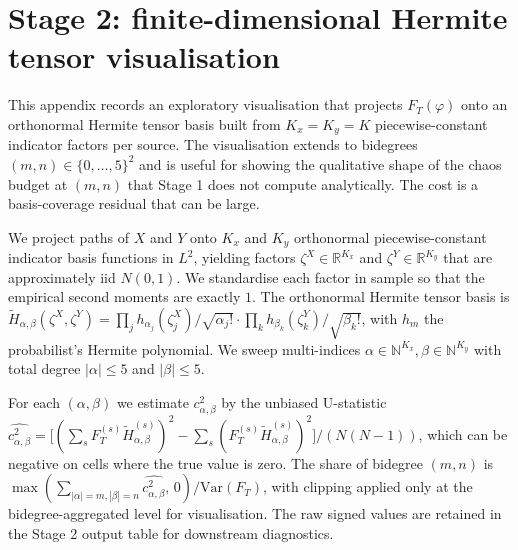 \documentclass[11pt,reqno]{amsart}
\theoremstyle{plain}
\theoremstyle{definition}
\theoremstyle{remark}
\newcommand{\R}{\mathbb{R}}
\newcommand{\N}{\mathbb{N}}
\newcommand{\Var}{\mathrm{Var}}
\begin{document}
\appendix

\section{Stage 2: finite-dimensional Hermite tensor visualisation}
\label{sec:stage2}

This appendix records an exploratory visualisation that projects
$F_T(\varphi)$ onto an orthonormal Hermite tensor basis built from
$K_x = K_y = K$ piecewise-constant indicator factors per source. The
visualisation extends to bidegrees $(m, n) \in \{0, \dots, 5\}^2$ and
is useful for showing the qualitative shape of the chaos budget at
$(m, n)$ that Stage 1 does not compute analytically. The cost is a
basis-coverage residual that can be large.

We project paths of $X$ and $Y$ onto $K_x$ and $K_y$ orthonormal
piecewise-constant indicator basis functions in $L^2$, yielding
factors $\zeta^X \in \R^{K_x}$ and $\zeta^Y \in \R^{K_y}$ that are
approximately iid $N(0, 1)$. We standardise each factor in sample so
that the empirical second moments are exactly $1$. The orthonormal
Hermite tensor basis is
$\widetilde H_{\alpha, \beta}(\zeta^X, \zeta^Y)
 = \prod_j h_{\alpha_j}(\zeta^X_j)/\sqrt{\alpha_j!}
 \cdot \prod_k h_{\beta_k}(\zeta^Y_k)/\sqrt{\beta_k!}$,
with $h_m$ the probabilist's Hermite polynomial. We sweep multi-indices
$\alpha \in \N^{K_x}, \beta \in \N^{K_y}$ with total degree
$|\alpha| \le 5$ and $|\beta| \le 5$.

For each $(\alpha, \beta)$ we estimate $c_{\alpha, \beta}^2$ by the
unbiased U-statistic
$\widehat{c_{\alpha, \beta}^2} =
\bigl[(\sum_s F_T^{(s)} \widetilde H_{\alpha, \beta}^{(s)})^2
 - \sum_s (F_T^{(s)} \widetilde H_{\alpha, \beta}^{(s)})^2\bigr]
/ (N (N - 1))$,
which can be negative on cells where the true value is zero. The
share of bidegree $(m, n)$ is
$\max(\sum_{|\alpha| = m, |\beta| = n} \widehat{c_{\alpha, \beta}^2},\, 0)
/ \Var(F_T)$, with clipping applied only at the bidegree-aggregated
level for visualisation. The raw signed values are retained in the
Stage 2 output table for downstream diagnostics.
\end{document}
